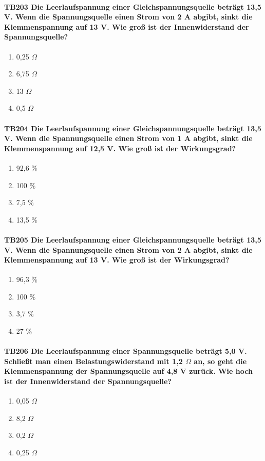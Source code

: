\documentclass[8pt]{article}
\begin{document}
\begin{enumerate}
\paragraph*{TB203 Die Leerlaufspannung einer Gleichspannungsquelle beträgt 13,5 V. Wenn die Spannungsquelle einen Strom von 2 A abgibt, sinkt die Klemmenspannung auf 13 V. Wie groß ist der Innenwiderstand der Spannungsquelle?}
\begin{enumerate}[nolistsep,label=\Alph*]
\item 0,25 $\Omega$
\item 6,75 $\Omega$
\item 13 $\Omega$
\item 0,5 $\Omega$
\end{enumerate}



\paragraph*{TB204 Die Leerlaufspannung einer Gleichspannungsquelle beträgt 13,5 V. Wenn die Spannungsquelle einen Strom von 1 A abgibt, sinkt die Klemmenspannung auf 12,5 V. Wie groß ist der Wirkungsgrad?}
\begin{enumerate}[nolistsep,label=\Alph*]
\item 92,6 \%
\item 100 \%
\item 7,5 \%
\item 13,5 \%
\end{enumerate}



\paragraph*{TB205 Die Leerlaufspannung einer Gleichspannungsquelle beträgt 13,5 V. Wenn die Spannungsquelle einen Strom von 2 A abgibt, sinkt die Klemmenspannung auf 13 V. Wie groß ist der Wirkungsgrad?}
\begin{enumerate}[nolistsep,label=\Alph*]
\item 96,3 \%
\item 100 \%
\item 3,7 \%
\item 27 \%
\end{enumerate}



\paragraph*{TB206 Die Leerlaufspannung einer Spannungsquelle beträgt 5,0 V. Schließt man einen Belastungswiderstand mit 1,2 $\Omega$ an, so geht die Klemmenspannung der Spannungsquelle auf 4,8 V zurück. Wie hoch ist der Innenwiderstand der Spannungsquelle?}
\begin{enumerate}[nolistsep,label=\Alph*]
\item 0,05 $\Omega$
\item 8,2 $\Omega$
\item 0,2 $\Omega$
\item 0,25 $\Omega$
\end{enumerate}




\end{enumerate}
\end{document}
